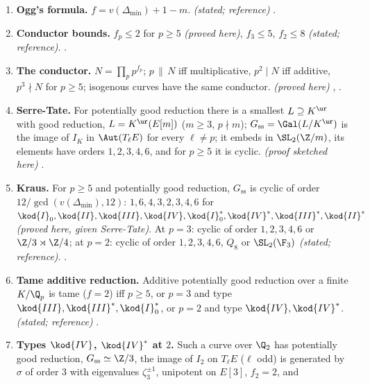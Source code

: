 \begin{enumerate}[label=\textbf{\thechapter.\arabic*}]
(good), $1$ (multiplicative, $V^I$ a line), $2+\operatorname{sw}\ge2$ (additive, $V^I=0$), and $\operatorname{sw}=0$ for $p\ge5$, and for $p$ odd at an
additive potentially multiplicative prime \emph{(proved here, given the criterion of N\'eron, Ogg and Shafarevich)}.
, .
\item \textbf{Ogg's formula.} $f=v(\Delta_{\min})+1-m$. \emph{(stated; reference)} .
\item \textbf{Conductor bounds.} $f_p\le2$ for $p\ge5$ \emph{(proved here)}, $f_3\le5$, $f_2\le8$ \emph{(stated; reference)}.
.
\item \textbf{The conductor.} $N=\prod_pp^{f_p}$; $p\,\|\,N$ iff multiplicative, $p^2\mid N$ iff additive, $p^3\nmid N$ for $p\ge5$; isogenous curves
have the same conductor. \emph{(proved here)} , .
\item \textbf{Serre-Tate.} For potentially good reduction there is a smallest $L\supseteq K^{\ur}$ with good reduction, $L=K^{\ur}(E[m])$ ($m\ge3$,
$p\nmid m$); $G_{\mathrm{ss}}=\Gal(L/K^{\ur})$ is the image of $I_K$ in $\Aut(T_\ell E)$ for every $\ell\ne p$; it embeds in $\SL_2(\Z/m)$, its elements
have orders $1,2,3,4,6$, and for $p\ge5$ it is cyclic. \emph{(proof sketched here)} .
\item \textbf{Kraus.} For $p\ge5$ and potentially good reduction, $G_{\mathrm{ss}}$ is cyclic of order $12/\gcd(v(\Delta_{\min}),12)$: $1,6,4,3,2,3,4,6$
for $\kod{I}_0,\kod{II},\kod{III},\kod{IV},\kod{I}_0^*,\kod{IV}^*,\kod{III}^*,\kod{II}^*$ \emph{(proved here, given Serre-Tate)}. At $p=3$:
cyclic of order $1,2,3,4,6$ or $\Z/3\rtimes\Z/4$; at $p=2$: cyclic of order $1,2,3,4,6$, $Q_8$ or $\SL_2(\F_3)$ \emph{(stated; reference)}.
.
\item \textbf{Tame additive reduction.} Additive potentially good reduction over a finite $K/\Q_p$ is tame ($f=2$) iff $p\ge5$, or $p=3$ and type
$\kod{III},\kod{III}^*,\kod{I}_0^*$, or $p=2$ and type $\kod{IV},\kod{IV}^*$. \emph{(stated; reference)} .
\item \textbf{Types $\kod{IV}$, $\kod{IV}^*$ at $2$.} Such a curve over $\Q_2$ has potentially good reduction, $G_{\mathrm{ss}}\simeq\Z/3$, the image of
$I_2$ on $T_\ell E$ ($\ell$ odd) is generated by $\sigma$ of order $3$ with eigenvalues $\zeta_3^{\pm1}$, unipotent on $E[3]$, $f_2=2$, and

\end{enumerate}

